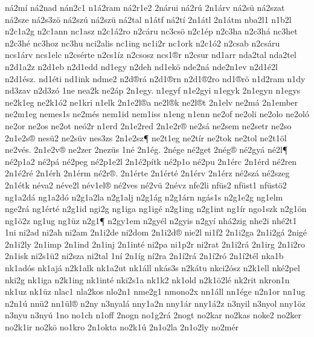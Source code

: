 {n^^e12m^^ed
n^^e12nad
n^^e1n2c1
n1^^e12ram
n^^e12r1e2
2n^^e1rui
n^^e12r^^fa
2n1^^e1rv
n^^e12s^^fc
n^^e12szat
n^^e12sze
n^^e12s3z^^f6
n^^e12sz^^fa
n^^e12sz^^fc
n^^e12tal
n1^^e1tf
n^^e12t^^ed
2n1^^e1tl
2n1^^e1tm
nba2l1
n1b2l
n2c1a2g
n2c1ann
nc1asz
n2c1^^e12ro
n2c^^e1ru
nc3cs^^f6
n2c1^^e9p
n2c3ha
n2c3h^^e1
nc3het
n2c3h^^e9
nc3hoz
nc3hu
nci2alis
nc1ing
nc1i2r
nc1ork
n2c1^^f32
n2csab
n2cs^^e1ru
ncs1^^e1rv
ncs1elc
n2cs^^e9rte
n2cs1^^edz
n2csosz
ncs1^^aer
n2csur
nd1arr
nda2tal
nda2tel
n2d1a2z
n2d1eb
n2d1edd
nd1egy
n2deh
nd1ek^^f6
nde2n^^e1
nde2n1ev
n2d1^^e92l
n2d1^^e9sz.
nd1^^e9ti
nd1ink
ndme2
n2d^^aer^^e1
n2d1^^aern
n2d1^^ae2ro
nd1^^aer^^f6
n1d2ram
n1dy
nd3zav
n2d3z^^f3
1ne
nea2k
ne2^^e1p
2n1egy.
n1egyf
n1e2gyi
n1egyk
2n1egyn
n1egys
ne2k1eg
ne2k1^^f32
ne1kri
n1elk
2n1e2l^^aea
ne2l^^aek
ne2l^^aet
2n1elv
ne2m^^e1
2n1ember
ne2m1eg
nemes1s
ne2m^^e9s
nem1id
nem1iss
n1eng
n1enn
ne2of
ne2oli
ne2olo
ne2ol^^f3
ne2or
ne2os
ne2ot
ne^^f32r
n1erd
2n1e2red
2n1e2r^^ae
ne2s^^e1
ne2sem
ne2setr
ne2so
2n1e2s^^ae
nes^^fc2
ne2s^^fcv
nes3zs
2n1e2sz^^b6
ne2t1eg
ne2t^^edr
ne2tok
ne2tol
ne2t1^^f6l
ne2v^^e9s.
2n1e2v^^ae
ne2zer
2nez^^fcs
1n^^e9
2n1^^e9g.
2n^^e9ge
n^^e92get
2n^^e9g^^ae
n^^e92gy^^e1
n^^e92l^^b6
n^^e92p1a2
n^^e92p^^e1
n^^e92peg
n^^e92p1e2l
2n1^^e92p^^edtk
n^^e92p1o
n^^e92pu
2n1^^e9rc
2n1^^e9rd
n^^e92ren
2n1^^e92r^^e9
2n1^^e9rh
2n1^^e9rm
n^^e92r^^ae.
2n1^^e9rte
2n1^^e9rt^^e9
2n1^^e9rv
2n1^^e9rz
n^^e92sz^^e1
n^^e92szeg
2n1^^e9tk
n^^e9va2
n^^e9ve2l
n^^e9v1el^^ae
n^^e92ves
n^^e92v^^fc
2n^^e9vz
nfe2li
nf^^fcs2
nf^^fcst1
nf^^fcst^^f62
ng1a2d^^e1
ng1a2d^^f3
n2g1a2la
n2g1alj
n2g1^^e1g
n2g1^^e1rn
ng^^e1s1s
n2g1e2g
ng1elm
nge2r^^e1
ng1^^e9rt^^e9
n2g1id
ngi2g
ng1iga
ng1ig^^e9
n2g1ing
n2g1int
ng1^^edr
ngo1szk
n2g1^^f6n
ng1^^f62z
ng1ug
ng1^^fcz
n2g1^^b6
n2gy1em
n2gy^^e9l
n2gyis
n2gy^^ed
nh^^e12zig
nhe2i
nh^^e92t1
1ni
ni2ad
ni2ah
ni2am
2n1i2de
ni2dom
2n1i2d^^ae
nie2l
ni1f2
2n1i2ga
2n1i2g^^e1
2nig^^e9
2n1i2ly
2n1imp
2n1ind
2n1inj
2n1int^^e9
ni2pa
ni1p2r
ni2rat
2n1i2r^^e1
2n1irg
2n1i2ro
2n1isk
ni2s1^^fc2
ni2sza
ni2tal
1n^^ed
2n1^^edg
n^^ed2ra
2n1^^ed2r^^e1
2n1^^ed2r^^f3
2n1^^ed2t^^e9l
nka1b
nk1ad^^f3s
nk1aj^^e1
n2k1alk
nk1a2ut
nk1^^e1ll
nk^^e1s3s
n2k^^e1tu
nkci2^^f3sz
n2k1ell
nk^^e92pel
nki2g
nk1iga
n2k1ing
nk1int^^e9
nki2s1a
nk1k2
nk1old
n2k1^^f62l^^e9
nk2rit
nkron1n
nk1uz
nk1^^fcz
nlac1
nla2kos
nlo2n1
nme2g1
nmono2x
nn1^^e1ll
nn1^^e9ge
n2n1or
nn1ug
n2n1^^fa
nn^^fc2
nn1^^fcl^^ae
n2ny
n3nyal^^e1
nny1a2n
nny1^^e1r
nny1^^e12z
n3nyil
n3nyol
nny1^^f6z
n3nyu
n3ny^^fa
1no
no1ch
n1off
2nogn
no1g2r^^e1
2nogt
no2kar
no2kas
noke2
no2ker
no2k1ir
no2k^^f6
no1kro
2n1okta
no2k1^^fa
2n1o2la
2n1o2ly
no2m^^e9r
}
